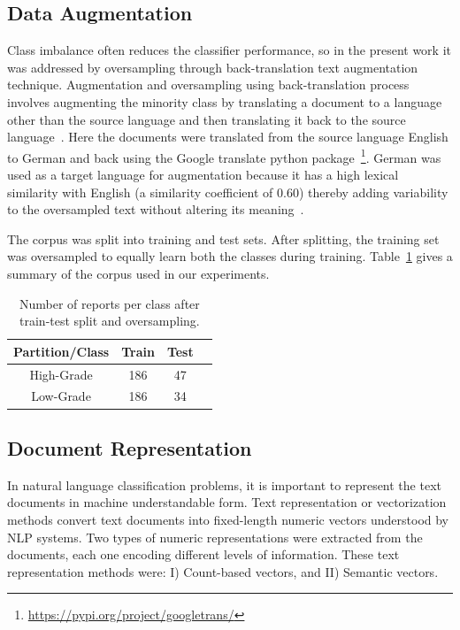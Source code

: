 \documentclass[runningheads]{llncs}
\begin{document}
\subsection{Data Augmentation}
\label{subsec:aug}
%
Class imbalance often reduces the classifier performance, so in the present work it was addressed by oversampling through back-translation text augmentation technique.
Augmentation and oversampling using back-translation process involves augmenting the minority class by translating a document to a language other than the source language and then translating it back to the source language~\cite{WLV2020}.
Here the documents were translated from the source language English to German and back using the Google translate python package~\footnote{\url{https://pypi.org/project/googletrans/}}.
German was used as a target language for augmentation because it has a high lexical similarity with English (a similarity coefficient of 0.60) thereby adding variability to the oversampled text without altering its meaning~\cite{lexical}.

The corpus was split into training and test sets. After splitting, the training set was oversampled to equally learn both the classes during training. Table~\ref{tbl:dataset} gives a summary of the corpus used in our experiments.
%
\begin{table}
\begin{center}
\caption{Number of reports per class after train-test split and oversampling.}\label{tbl:dataset}
\begin{tabular}{|c|c|c|c|}
\hline
Partition/Class &   Train & Test\\
\hline
High-Grade & 186 & 47\\
\hline
Low-Grade & 186 & 34\\
\hline
\end{tabular}
\end{center}
\end{table}
%
\subsection{Document Representation}
\label{subsec:doc_rep}
%
In natural language classification problems, it is important to represent the text documents in machine understandable form.
Text representation or vectorization methods convert text documents into fixed-length numeric vectors understood by NLP systems.
Two types of numeric representations were extracted from the documents, each one encoding different levels of information.
These text representation methods were: I) Count-based vectors, and II) Semantic vectors.
%
\end{document}
